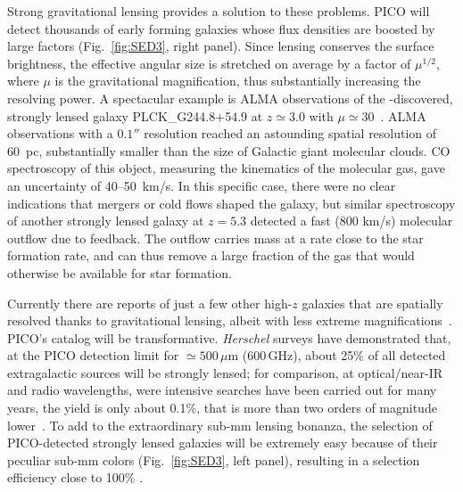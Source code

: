 \documentclass[PICOReport.tex]{subfiles}
\begin{document}
Strong gravitational lensing provides a solution to these problems. PICO will detect thousands of early forming galaxies whose flux densities are boosted by large factors (Fig.~\ref{fig:SED3}, right panel). Since lensing conserves the surface brightness, the effective angular size is stretched on average by a factor of $\mu^{1/2}$, where $\mu$ is the gravitational magnification, thus substantially increasing the resolving power. A spectacular example is ALMA observations of the \planck-discovered, strongly lensed galaxy PLCK\_G244.8\-+54.9 at $z \simeq 3.0$  with $\mu \simeq 30$~\citep{Canameras2017ALMA}. ALMA observations with a $0.1''$ resolution reached an astounding spatial resolution of 60~pc, substantially smaller than the size of Galactic giant molecular clouds. CO spectroscopy of this object, measuring the kinematics of the molecular gas, gave an uncertainty of 40--50~km/s. In this specific case, there were no clear indications that mergers or cold flows shaped the galaxy, but similar spectroscopy of another strongly lensed galaxy at $z=5.3$ detected a fast (800 km/s) molecular outflow due to feedback. The outflow carries mass at a rate close to the star formation rate, and can thus remove a large fraction of the gas that would otherwise be available for star formation.  

Currently there are reports of just a few other high-$z$ galaxies that are spatially resolved thanks to gravitational lensing, albeit with less extreme magnifications~\citep{Dye2018, Lamarche2018, Sharda2018}. PICO's catalog will be transformative. \textit{Herschel} surveys have demonstrated that, at the PICO detection limit for $\simeq 500\,\mu$m (600\,GHz), about 25\% of all detected extragalactic sources will be strongly lensed; for comparison, at optical/near-IR and radio wavelengths, were intensive searches have been carried out for many years, the yield is only about 0.1\%, that is more than two orders of magnitude lower~\cite{Treu2010}. To add to the extraordinary sub-mm lensing bonanza, the selection of PICO-detected strongly lensed galaxies will be extremely easy because of their peculiar sub-mm colors (Fig.~\ref{fig:SED3}, left panel), resulting in a selection efficiency close to 100\% \citep{Negrello2010}. 
\end{document}
